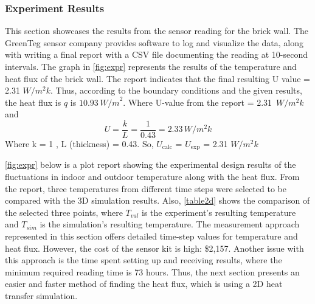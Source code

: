 \subsubsection{Experiment Results}
This section showcases the results from the sensor reading for the brick wall. The GreenTeg sensor company provides software to log and visualize the data, along with writing a final report with a CSV file documenting the reading at 10-second intervals. The graph in \ref{fig:expr} represents the results of the temperature and heat flux of the brick wall. 
The report indicates that the final resulting U value = 2.31 ${W/m^2k}$. Thus, according to the boundary conditions and the given results, the heat flux is \( q \) is \( 10.93\, {W/m}^2 \). 
Where U-value from the report = 2.31\, ${W/m^2k}$ and 
\begin{equation}
    U = \frac{k}{L}
      = \frac{1}{0.43} = 2.33\,  {W/m^2k}
\end{equation}
Where k = 1 , L (thickness) = 0.43. So, \(U_{\text{calc}}\) = \(U_{\text{exp}}\) = 2.31 ${W/m^2k}$ 

\ref{fig:expr} below is a plot report showing the experimental design results of the fluctuations in indoor and outdoor temperature along with the heat flux. From the report, three temperatures from different time steps were selected to be compared with the 3D simulation results. Also, \ref{table2d} shows the comparison of the selected three points, where $T_{val}$ is the experiment's resulting temperature and $T_{sim}$ is the simulation's resulting temperature. 
The measurement approach represented in this section offers detailed time-step values for temperature and heat flux. However, the cost of the sensor kit is high: \$2,157. Another issue with this approach is the time spent setting up and receiving results, where the minimum required reading time is 73 hours. Thus, the next section presents an easier and faster method of finding the heat flux, which is using a 2D heat transfer simulation.




